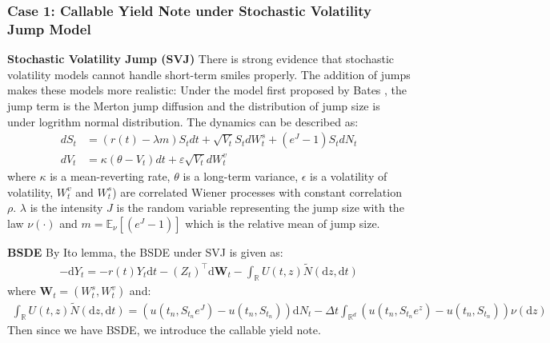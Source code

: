 \documentclass[11pt,a4paper]{article}
\theoremstyle{remark}
\begin{document}
\subsubsection{Case 1: Callable Yield Note under Stochastic Volatility Jump Model}
\noindent \textbf{Stochastic Volatility Jump (SVJ)} There is strong evidence that stochastic volatility models cannot handle short-term smiles properly. The addition of jumps makes these models more realistic: Under the model first proposed by Bates \cite{bates1996jumps}, the jump term is the Merton jump diffusion and the distribution of jump size is under logrithm normal distribution. The dynamics can be described as:
\begin{align*}
	d S_t & =(r(t)-\lambda m) S_t d t+\sqrt{V_t} S_t d W^s_t + \left(e^J-1\right) S_t d N_t \\
	d V_t & =\kappa(\theta-V_t) d t+\varepsilon \sqrt{V_t} d W^v_t
\end{align*}
where $\kappa$ is a mean-reverting rate, $\theta$ is a long-term variance, $\epsilon$ is a volatility of volatility, $W^v_t$ and $W^s_t$) are correlated Wiener processes with constant correlation $\rho$. $\lambda$ is the intensity $J$ is the random variable representing the jump size with the law  $\nu(\cdot)$ and $m  = \mathbb{E}_{\nu}\left[\left(e^J-1\right)\right]$ which is the relative mean of jump size.

\noindent \textbf{BSDE}  By Ito lemma, the BSDE under SVJ is given as:
\begin{align*}
	-\mathrm{d}Y_t = -r(t) Y_t \mathrm{d} t - (Z_t)^{\top}  \mathrm{d}\boldsymbol{W}_t- \int_{\mathbb{R}}U(t,z) \tilde{N}\left(\mathrm{d} z, \mathrm{d} t\right) 
\end{align*}
where $\boldsymbol{W}_t = (W^s_t, W^v_t)$ and:
\begin{align*}
	\int_{\mathbb{R}}U(t,z) \tilde{N}\left(\mathrm{d} z, \mathrm{d} t\right)  =  \left(u(t_n, S_{t_n}e^J) - u(t_n, S_{t_n})\right) \mathrm{d} N_t- \Delta t \int_{\mathbb{R}^d}\left(u(t_n, S_{t_n}e^{z}) - u(t_n, S_{t_n})\right)\nu(\mathrm{d}z)
\end{align*}
Then since we have BSDE, we introduce the callable yield note.
\end{document}
